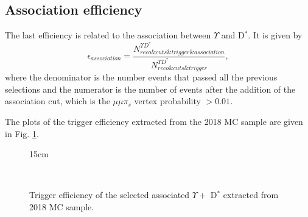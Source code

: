 \subsection{Association efficiency}

The last efficiency is related to the association between $\Upsilon$ and D$^*$. It is given by
\begin{equation}
  \epsilon_{association} =
  \frac{N_{reco\&cuts\&trigger\&association}^{\Upsilon D^*}}{N_{reco\&cuts\&trigger}^{\Upsilon D^*}},
\end{equation}
where the denominator is the number events that passed all the previous selections and the numerator is the number of events after the addition of the association cut, which is the $\mu\mu\pi_s$ vertex probability $> 0.01$.

The plots of the trigger efficiency extracted from the 2018 MC sample are given in Fig. \ref{fig:eff_asso}.

\begin{figure}[!htm]{15cm}
  \caption{Trigger efficiency of the selected associated $\Upsilon +$ D$^*$ extracted from 2018 MC sample.}
  \label{fig:eff_asso}
  \hfill
  \hfill\\
\end{figure}

